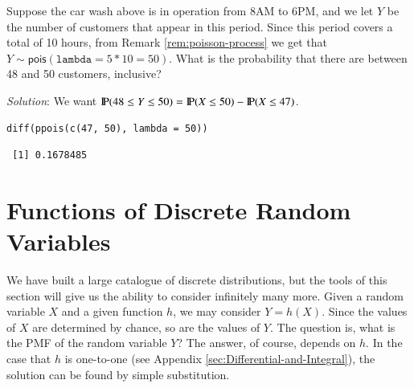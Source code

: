 \documentclass[captions=tableheading]{scrbook}
\begin{document}
\begin{example}
Suppose the car wash above is in operation from 8AM to 6PM, and we let \(Y\) be the number of customers that appear in this period. Since this period covers a total of 10 hours, from Remark \ref{rem:poisson-process} we get that \(Y\sim\mathsf{pois}(\mathtt{lambda}=5\ast10=50)\). What is the probability that there are between 48 and 50 customers, inclusive? 

\emph{Solution}: We want \(\P(48\leq Y\leq50)=\P(X\leq50)-\P(X\leq47)\). 


\begin{verbatim}
diff(ppois(c(47, 50), lambda = 50))
\end{verbatim}

\begin{verbatim}
 [1] 0.1678485
\end{verbatim}

\end{example}
\section{Functions of Discrete Random Variables}
\label{sec-1-7}

\label{sec:functions-discrete-rvs}

We have built a large catalogue of discrete distributions, but the tools of this section will give us the ability to consider infinitely many more. Given a random variable \(X\) and a given function \(h\), we may consider \(Y=h(X)\). Since the values of \(X\) are determined by chance, so are the values of \(Y\). The question is, what is the PMF of the random variable \(Y\)? The answer, of course, depends on \(h\). In the case that \(h\) is one-to-one (see Appendix \ref{sec:Differential-and-Integral}), the solution can be found by simple substitution.
\end{document}
